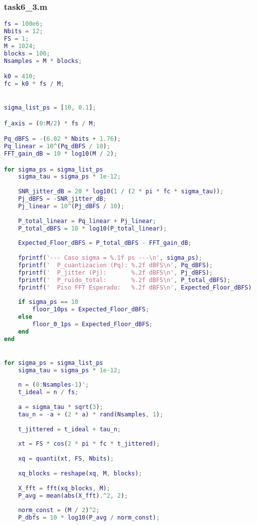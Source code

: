 \subsubsection{task6\_3.m}
\begin{lstlisting}[language=Matlab]
fs = 100e6;
Nbits = 12;
FS = 1;
M = 1024;
blocks = 100;
Nsamples = M * blocks;

k0 = 410;
fc = k0 * fs / M;


sigma_list_ps = [10, 0.1];

f_axis = (0:M/2) * fs / M;

Pq_dBFS = -(6.02 * Nbits + 1.76);
Pq_linear = 10^(Pq_dBFS / 10);
FFT_gain_dB = 10 * log10(M / 2);

for sigma_ps = sigma_list_ps
    sigma_tau = sigma_ps * 1e-12;
    
    SNR_jitter_dB = 20 * log10(1 / (2 * pi * fc * sigma_tau));
    Pj_dBFS = -SNR_jitter_dB;
    Pj_linear = 10^(Pj_dBFS / 10);
    
    P_total_linear = Pq_linear + Pj_linear;
    P_total_dBFS = 10 * log10(P_total_linear);
    
    Expected_Floor_dBFS = P_total_dBFS - FFT_gain_dB;
    
    fprintf('--- Caso sigma = %.1f ps ---\n', sigma_ps);
    fprintf('  P_cuantizacion (Pq): %.2f dBFS\n', Pq_dBFS);
    fprintf('  P_jitter (Pj):       %.2f dBFS\n', Pj_dBFS);
    fprintf('  P_ruido_total:       %.2f dBFS\n', P_total_dBFS);
    fprintf('  Piso FFT Esperado:   %.2f dBFS\n', Expected_Floor_dBFS);
    
    if sigma_ps == 10
        floor_10ps = Expected_Floor_dBFS;
    else
        floor_0_1ps = Expected_Floor_dBFS;
    end
end


for sigma_ps = sigma_list_ps
    sigma_tau = sigma_ps * 1e-12;
    
    n = (0:Nsamples-1)';
    t_ideal = n / fs;
    
    a = sigma_tau * sqrt(3);
    tau_n = -a + (2 * a) * rand(Nsamples, 1);
    
    t_jittered = t_ideal + tau_n;
    
    xt = FS * cos(2 * pi * fc * t_jittered);
    
    xq = quanti(xt, FS, Nbits);
    
    xq_blocks = reshape(xq, M, blocks);
    
    X_fft = fft(xq_blocks, M);
    P_avg = mean(abs(X_fft).^2, 2);
    
    norm_const = (M / 2)^2;
    P_dbfs = 10 * log10(P_avg / norm_const);
    

\end{lstlisting}
